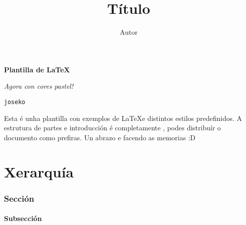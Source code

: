 \documentclass[12pt, titlepage]{article}
\title{\textbf {Título}}
\author{Autor}
\date{}
\begin{document}

    \begin{titlepage}
        \begin{center}
            \vspace*{3cm}
            \textbf{\LARGE Plantilla de \LaTeX}

            \vspace*{0.3cm}
            \textit{\large Agora con cores \textcolor{k_blue}{p}\textcolor{k_yellow}{a}\textcolor{k_green}{s}\textcolor{k_yellow}{t}\textcolor{k_blue}{e}\textcolor{k_green}{l}!}

            \vspace*{12cm}
            \texttt{\large \textcolor{k_green}{joseko}}

            \vspace*{1cm}
            Esta é unha plantilla con exemplos de \LaTeX e distintos estilos predefinidos. A estrutura de partes e introducción é completamente , podes distribuír o documento como prefiras. Un abrazo e  facendo as memorias \textcolor{k_yellow}{:D}
        \end{center}
    \end{titlepage}

    { \setlength{\parskip}{0pt} %
      \tableofcontents }




    \newpage
    \part{Xerarquía}

    \section{Sección}

    \subsection{Subsección}
    
\end{document}
